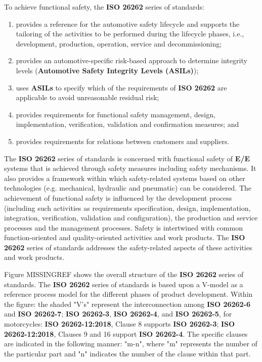\documentclass[./dissertation.tex]{subfiles}
\begin{document}
To achieve functional safety, the \textbf{ISO 26262} series of standards:

\begin{enumerate}
\item provides a reference for the automotive safety lifecycle and supports the tailoring of the activities to be performed during the lifecycle phases, i.e., development, production, operation, service and decommissioning;
\item provides an automotive-specific risk-based approach to determine integrity levels (\textbf{Automotive Safety Integrity Levels (ASILs)});
\item uses \textbf{ASILs} to specify which of the requirements of \textbf{ISO 26262} are applicable to avoid unreasonable residual risk;
\item provides requirements for functional safety management, design, implementation, verification, validation and confirmation measures; and
\item provides requirements for relations between customers and suppliers.
\end{enumerate}

The \textbf{ISO 26262} series of standards is concerned with functional safety of \textbf{E/E} systems that is achieved through safety measures including safety mechanisms. It also provides a framework within which safety-related systems based on other technologies (e.g. mechanical, hydraulic and pneumatic) can be considered. The achievement of functional safety is influenced by the development process (including such activities as requirements specification, design, implementation, integration, verification, validation and configuration), the production and service processes and the management processes. Safety is intertwined with common function-oriented and quality-oriented activities and work products. The \textbf{ISO 26262} series of standards addresses the safety-related aspects of these activities and work products.

Figure MISSINGREF shows the overall structure of the \textbf{ISO 26262} series of standards. The \textbf{ISO 26262} series of standards is based upon a V-model as a reference process model for the different phases of product development. Within the figure: the shaded "V's" represent the interconnection among \textbf{ISO 26262-6} and \textbf{ISO 26262-7}; \textbf{ISO 26262-3}, \textbf{ISO 26262-4}, and \textbf{ISO 26262-5}, for motorcycles: \textbf{ISO 26262-12:2018}, Clause 8 supports \textbf{ISO 26262-3}; \textbf{ISO 26262-12:2018}, Clauses 9 and 16 support \textbf{ISO 26262-4}. The specific clauses are indicated in the following manner: "m-n", where "m" represents the number of the particular part and "n" indicates the number of the clause within that part.
\end{document}
